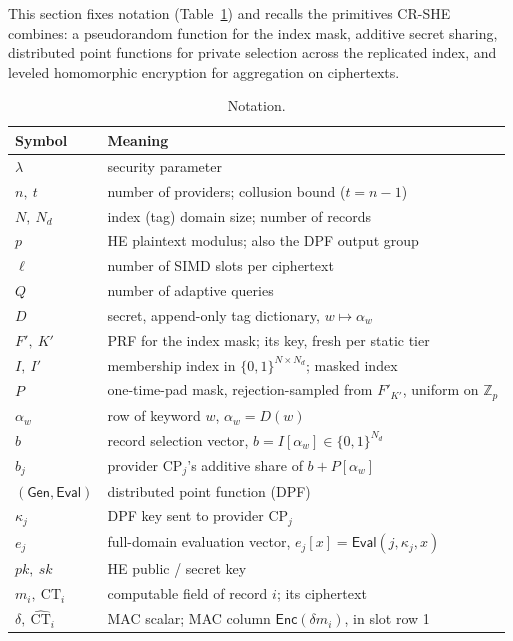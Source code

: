 \documentclass[a4paper,fleqn]{cas-sc}
\newcommand{\Gen}{\mathsf{Gen}}
\newcommand{\Eval}{\mathsf{Eval}}
\newcommand{\Enc}{\mathsf{Enc}}
\begin{document}
This section fixes notation (Table~\ref{tab:notation}) and recalls the
primitives CR-SHE combines: a pseudorandom function for the index mask,
additive secret sharing, distributed point functions for private selection
across the replicated index, and leveled homomorphic encryption for
aggregation on ciphertexts.

\begin{table}[pos=htbp]
\caption{Notation.}
\label{tab:notation}
\centering
\footnotesize
\setlength{\tabcolsep}{4pt}
\begin{tabular}{@{}l>{\raggedright\arraybackslash}p{5.5cm}@{}}
\toprule
Symbol & Meaning \\
\midrule
$\lambda$ & security parameter \\
$n,\ t$ & number of providers; collusion bound ($t=n-1$) \\
$N,\ N_d$ & index (tag) domain size; number of records \\
$p$ & HE plaintext modulus; also the DPF output group \\
$\ell$ & number of SIMD slots per ciphertext \\
$Q$ & number of adaptive queries \\
$D$ & secret, append-only tag dictionary, $w\mapsto\alpha_w$ \\
$F',\ K'$ & PRF for the index mask; its key, fresh per static tier \\
$I,\ I'$ & membership index in $\{0,1\}^{N\times N_d}$; masked index \\
$P$ & one-time-pad mask, rejection-sampled from $F'_{K'}$, uniform on
$\mathbb{Z}_p$ \\
$\alpha_w$ & row of keyword $w$, $\alpha_w=D(w)$ \\
$b$ & record selection vector, $b=I[\alpha_w]\in\{0,1\}^{N_d}$ \\
$b_j$ & provider $\text{CP}_j$'s additive share of $b+P[\alpha_w]$ \\
$(\Gen,\Eval)$ & distributed point function (DPF) \\
$\kappa_j$ & DPF key sent to provider $\text{CP}_j$ \\
$e_j$ & full-domain evaluation vector, $e_j[x]=\Eval(j,\kappa_j,x)$ \\
$pk,\ sk$ & HE public / secret key \\
$m_i,\ \text{CT}_i$ & computable field of record $i$; its ciphertext \\
$\delta,\ \widehat{\text{CT}}_i$ & MAC scalar; MAC column $\Enc(\delta m_i)$,
in slot row 1 \\

\end{tabular}
\end{table}
\end{document}
